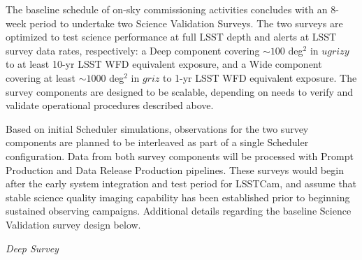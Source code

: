 The baseline schedule of on-sky commissioning activities concludes with an 8-week period to undertake two Science Validation Surveys.
The two surveys are optimized to test science performance at full LSST depth and alerts at LSST survey data rates, respectively: a Deep component covering $\sim100$ deg$^2$ in $ugrizy$ to at least 10-yr LSST WFD equivalent exposure, and a Wide component covering at least $\sim1000$ deg$^2$ in $griz$ to 1-yr LSST WFD equivalent exposure.
The survey components are designed to be scalable, depending on needs to verify and validate operational procedures described above.

Based on initial Scheduler simulations, observations for the two survey components are planned to be interleaved as part of a single Scheduler configuration.
Data from both survey components will be processed with Prompt Production and Data Release Production pipelines.
These surveys would begin after the early system integration and test period for LSSTCam, and assume that stable science quality imaging capability has been established prior to beginning sustained observing campaigns.
Additional details regarding the baseline Science Validation survey design below.

\textit{Deep Survey}

